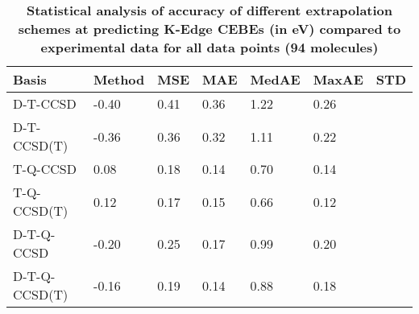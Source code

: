 \begin{table}
  \caption{\textbf{Statistical analysis of accuracy of different extrapolation schemes at predicting K-Edge CEBEs (in eV) compared to experimental data for all data points (94 molecules)}}
  \begin{tabular}{l l l l l l l }
    \toprule
    \textbf{Basis} & \textbf{Method} & \textbf{MSE} & \textbf{MAE} & \textbf{MedAE} & \textbf{MaxAE} & \textbf{STD} \\ 
    \midrule
    D-T-CCSD & -0.40 & 0.41 & 0.36 & 1.22 & 0.26 \\ 
    D-T-CCSD(T) & -0.36 & 0.36 & 0.32 & 1.11 & 0.22 \\ 
    T-Q-CCSD & 0.08 & 0.18 & 0.14 & 0.70 & 0.14 \\ 
    T-Q-CCSD(T) & 0.12 & 0.17 & 0.15 & 0.66 & 0.12 \\ 
    D-T-Q-CCSD & -0.20 & 0.25 & 0.17 & 0.99 & 0.20 \\ 
    D-T-Q-CCSD(T) & -0.16 & 0.19 & 0.14 & 0.88 & 0.18 \\ 
    \bottomrule
  \end{tabular}
\end{table}
